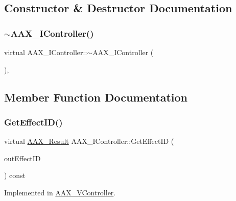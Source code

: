 \subsection{Constructor \& Destructor Documentation}
\mbox{\label{a01789_aa8dee55f260a0f92f29b95f9d7acc9dd}} 
\subsubsection{\texorpdfstring{$\sim$AAX\_IController()}{~AAX\_IController()}}
{\footnotesize\ttfamily virtual A\+A\+X\+\_\+\+I\+Controller\+::$\sim$\+A\+A\+X\+\_\+\+I\+Controller (\begin{DoxyParamCaption}\item[{void}]{ }\end{DoxyParamCaption})\hspace{0.3cm}{\ttfamily [inline]}, {\ttfamily [virtual]}}



\subsection{Member Function Documentation}
\mbox{\label{a01789_ab36371e7f7c47f30882684481285f5eb}} 
\subsubsection{\texorpdfstring{GetEffectID()}{GetEffectID()}}
{\footnotesize\ttfamily virtual \mbox{\hyperlink{a00392_a4d8f69a697df7f70c3a8e9b8ee130d2f}{A\+A\+X\+\_\+\+Result}} A\+A\+X\+\_\+\+I\+Controller\+::\+Get\+Effect\+ID (\begin{DoxyParamCaption}\item[{\mbox{\hyperlink{a01873}{A\+A\+X\+\_\+\+I\+String}} $\ast$}]{out\+Effect\+ID }\end{DoxyParamCaption}) const\hspace{0.3cm}{\ttfamily [pure virtual]}}



Implemented in \mbox{\hyperlink{a01905_ae1c1956d5ddd00afa59bd914a44b24da}{A\+A\+X\+\_\+\+V\+Controller}}.

